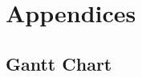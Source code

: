 \documentclass[11pt, titlepage]{article}
\begin{document}
	\tableofcontents
	
	\newpage
	
	
	
	
	\newpage

	\section*{Appendices}
		\begin{appendices}
			\label{app:gantt}
			\subsection*{Gantt Chart}
			\begin{minipage}{\textwidth}
				\begin{flushright}
				\end{flushright}
			\end{minipage}
		\end{appendices}

	\newpage
	
    \printbibliography
   
\end{document}
